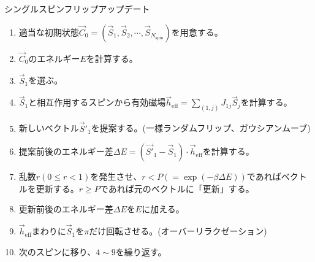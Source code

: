 \documentclass[12pt,titlepage,dvipdfmx]{jarticle}
\begin{document}
\begin{itembox}[1]{シングルスピンフリップアップデート}
   \begin{enumerate}
       \item 適当な初期状態$\vec{C}_0=(\vec{S}_1,\vec{S}_2,\cdots,\vec{S}_{N_{\mathrm{spin}}})$を用意する。
       \item $\vec{C}_0$のエネルギー$E$を計算する。
       \item $\vec{S}_1$を選ぶ。
       \item $\vec{S}_1$と相互作用するスピンから有効磁場$\vec{h}_{\mathrm{eff}} = \sum _{(1,j)}J_{1j}\vec{S}_j$を計算する。
       \item 新しいベクトル$\vec{S}'_1$を提案する。(一様ランダムフリップ\cite{Liu1988}、ガウシアンムーブ\cite{Evans2014})
       \item 提案前後のエネルギー差$\Delta E = (\vec{S'}_1 - \vec{S}_1) \cdot \vec{h}_{\mathrm{eff}}$を計算する。
       \item 乱数$r(0\le r<1)$を発生させ、$r < P (= \exp(-\beta \Delta E))$であればベクトルを更新する。$r\ge P$であれば元のベクトルに「更新」する。
       \item 更新前後のエネルギー差$\Delta E$を$E$に加える。
       \item $\vec{h}_{\mathrm{eff}}$まわりに$\vec{S}_1$を$\pi$だけ回転させる。(オーバーリラクゼーション\cite{Creutz1987})
       \item 次のスピンに移り、$4\sim9$を繰り返す。
   \end{enumerate}
\end{itembox}


\newpage

\end{document}

